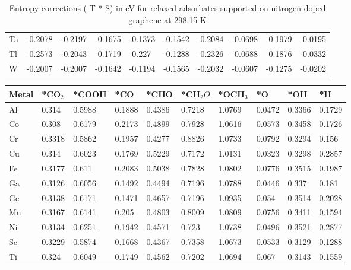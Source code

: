 \begin{table}[h]
{\begin{tabular}{*{10}{l}}
      Ta & -0.2078 & -0.2197 & -0.1675 & -0.1373 & -0.1542 & -0.2084 & -0.0698 & -0.1979 & -0.0195 \\
      Tl & -0.2573 & -0.2043 & -0.1719 & -0.227  & -0.1288 & -0.2326 & -0.0688 & -0.1876 & -0.0332 \\
      W  & -0.2007 & -0.2007 & -0.1642 & -0.1194 & -0.1565 & -0.2032 & -0.0607 & -0.1275 & -0.0202 \\
      \hline
  \end{tabular}
  }
  \caption{Entropy corrections (-T * S) in eV for relaxed adsorbates supported on nitrogen-doped graphene at 298.15 K}
  \label{si_table10}
\end{table}


\begin{table}[h]
  \centering
  {\fontsize{6}{12}\selectfont
  \begin{tabular}{*{10}{l}}
      \hline
      Metal & *CO$_2$ & *COOH & *CO & *CHO   & *CH$_2O$ & *OCH$_3$ & *O & *OH    & *H     \\
      \hline
      Al & 0.314  & 0.5988 & 0.1888 & 0.4386 & 0.7218 & 1.0769 & 0.0472 & 0.3366 & 0.1729 \\
      Co & 0.308  & 0.6179 & 0.2173 & 0.4899 & 0.7928 & 1.0616 & 0.0573 & 0.3458 & 0.1726 \\
      Cr & 0.3318 & 0.5862 & 0.1957 & 0.4277 & 0.8826 & 1.0733 & 0.0792 & 0.3294 & 0.156  \\
      Cu & 0.314  & 0.6023 & 0.1769 & 0.5229 & 0.7172 & 1.0131 & 0.0323 & 0.3298 & 0.2857 \\
      Fe & 0.3177 & 0.611  & 0.2083 & 0.5038 & 0.7828 & 1.0802 & 0.0776 & 0.3515 & 0.1987 \\
      Ga & 0.3126 & 0.6056 & 0.1492 & 0.4494 & 0.7196 & 1.0788 & 0.0446 & 0.337  & 0.181  \\
      Ge & 0.3138 & 0.6171 & 0.1471 & 0.4657 & 0.7196 & 1.0935 & 0.054  & 0.3514 & 0.2028 \\
      Mn & 0.3167 & 0.6141 & 0.205  & 0.4803 & 0.8009 & 1.0809 & 0.0756 & 0.3411 & 0.1594 \\
      Ni & 0.3134 & 0.6251 & 0.1942 & 0.4571 & 0.723  & 1.0738 & 0.0496 & 0.3521 & 0.2877 \\
      Sc & 0.3229 & 0.5874 & 0.1668 & 0.4367 & 0.7358 & 1.0673 & 0.0533 & 0.3129 & 0.1288 \\
      Ti & 0.324  & 0.6049 & 0.1749 & 0.4562 & 0.7202 & 1.0694 & 0.067  & 0.3143 & 0.1559 \\

\end{tabular}}
\end{table}
